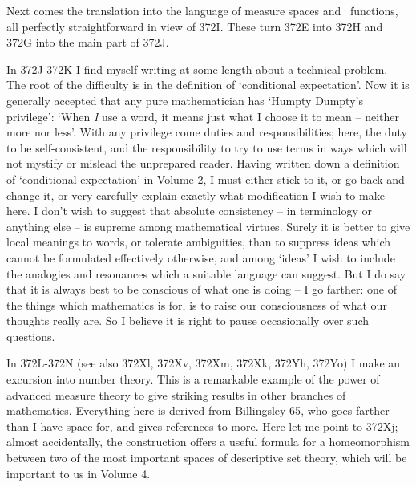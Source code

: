 {Next comes the translation into the language of measure spaces and \imp\
functions, all perfectly straightforward in view of
372I.   These turn 372E into 372H and 372G into the main part of
372J.

In 372J-372K I find myself writing at some length about a technical
problem.   The root of the difficulty is in the definition of
`conditional expectation'.   Now it is generally accepted that any pure
mathematician has `Humpty Dumpty's privilege':  `When {\it I} use
a word, it means just what I choose it to
mean -- neither more nor less'.   With any privilege come duties and
responsibilities;  here, the duty to be self-consistent, and
the responsibility to try to use terms in ways which will not mystify or
mislead the unprepared reader.   Having written down a definition of
`conditional expectation' in Volume 2, I must either stick to it, or go
back and change it, or very carefully explain exactly what modification
I wish to make here.   I don't wish to suggest that absolute consistency
-- in terminology or anything else -- is supreme among mathematical
virtues.   Surely it is better to give local meanings to words, or
tolerate ambiguities, than to suppress ideas which cannot be formulated
effectively otherwise, and among `ideas' I wish to include the
analogies and resonances which a suitable language can suggest.   But I
do say that it is always best to be conscious of what one is doing -- I
go farther:  one of the things which mathematics is for, is to raise our
consciousness of what our thoughts really are.   So I believe it is
right to pause occasionally over such questions.

In 372L-372N (see also 372Xl, 372Xv, 372Xm, 372Xk, 372Yh, 372Yo) I make an
excursion into number theory.   This is a remarkable example of the
power of advanced measure theory to give striking results in other
branches of mathematics.   Everything here is derived from {\smc
Billingsley 65}, who goes farther than I have space for, and gives
references to more.   Here let me point to 372Xj;  almost accidentally,
the construction offers a useful formula for a homeomorphism
between two of the most important spaces of descriptive set theory,
which will be important to us in Volume 4.

}
